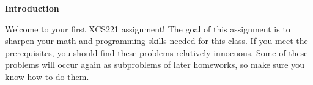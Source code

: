 {\bf Introduction}

Welcome to your first XCS221 assignment! The goal of this assignment is to
sharpen your math and programming skills needed for this class. If you meet the
prerequisites, you should find these problems relatively innocuous. Some of
these problems will occur again as subproblems of later homeworks, so make sure
you know how to do them.
